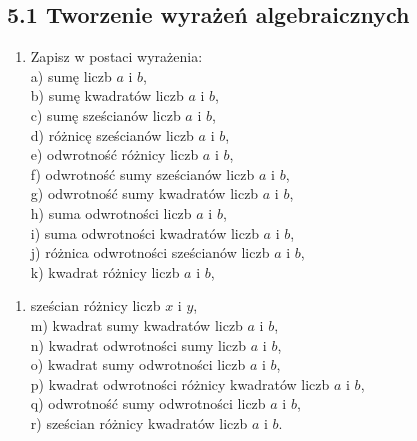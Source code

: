 \documentclass[10pt]{article}
\begin{document}
\subsection*{5.1 Tworzenie wyrażeń algebraicznych}
\begin{enumerate}
  \item Zapisz w postaci wyrażenia:\\
a) sumę liczb \(a\) i \(b\),\\
b) sumę kwadratów liczb \(a\) i \(b\),\\
c) sumę sześcianów liczb \(a\) i \(b\),\\
d) różnicę sześcianów liczb \(a\) i \(b\),\\
e) odwrotność różnicy liczb \(a\) i \(b\),\\
f) odwrotność sumy sześcianów liczb \(a\) i \(b\),\\
g) odwrotność sumy kwadratów liczb \(a\) i \(b\),\\
h) suma odwrotności liczb \(a\) i \(b\),\\
i) suma odwrotności kwadratów liczb \(a\) i \(b\),\\
j) różnica odwrotności sześcianów liczb \(a\) i \(b\),\\
k) kwadrat różnicy liczb \(a\) i \(b\),
\end{enumerate}

\begin{enumerate}
  \item sześcian różnicy liczb \(x\) i \(y\),\\
m) kwadrat sumy kwadratów liczb \(a\) i \(b\),\\
n) kwadrat odwrotności sumy liczb \(a\) i \(b\),\\
o) kwadrat sumy odwrotności liczb \(a\) i \(b\),\\
p) kwadrat odwrotności różnicy kwadratów liczb \(a\) i \(b\),\\
q) odwrotność sumy odwrotności liczb \(a\) i \(b\),\\
r) sześcian różnicy kwadratów liczb \(a\) i \(b\).
\end{enumerate}
\end{document}
